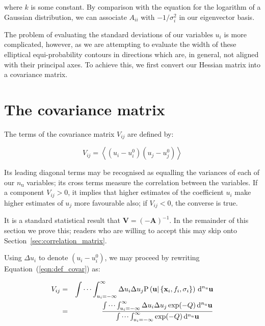 \noindent where $k$ is some constant. By comparison with the equation for the
logarithm of a Gaussian distribution, we can associate $A_{ii}$ with
$-1/\sigma_i^2$ in our eigenvector basis.

The problem of evaluating the standard deviations of our variables $u_i$ is
more complicated, however, as we are attempting to evaluate the width of these
elliptical equi-probability contours in directions which are, in general, not
aligned with their principal axes. To achieve this, we first convert our
Hessian matrix into a covariance matrix.

\section{The covariance matrix}

The terms of the covariance matrix $V_{ij}$ are defined by:

\begin{equation}
V_{ij} = \left< \left(u_i - u^0_i\right) \left(u_j - u^0_j\right) \right>
\label{eqn:def_covar}
\end{equation}

\noindent Its leading diagonal terms may be recognised as equalling the
variances of each of our $n_\mathrm{u}$ variables; its cross terms measure the
correlation between the variables. If a component $V_{ij} > 0$, it implies that
higher estimates of the coefficient $u_i$ make higher estimates of $u_j$ more
favourable also; if $V_{ij} < 0$, the converse is true.

It is a standard statistical result that $\mathbf{V} = (-\mathbf{A})^{-1}$. In
the remainder of this section we prove this; readers who are willing to accept
this may skip onto Section~\ref{sec:correlation_matrix}.

Using $\Delta u_i$ to denote $\left(u_i - u^0_i\right)$, we may proceed by
rewriting Equation~(\ref{eqn:def_covar}) as:

\begin{eqnarray}
V_{ij} & = & \idotsint_{u_i=-\infty}^{\infty}
\Delta u_i \Delta u_j
\mathrm{P}\left(
\mathbf{u} | \left\{ \mathbf{x}_i, f_i, \sigma_i \right\} \right)
\,\mathrm{d}^{n_\mathrm{u}}\mathbf{u} \\
 & = & \frac{
\idotsint_{u_i=-\infty}^{\infty} \Delta u_i \Delta u_j \exp(-Q) \,\mathrm{d}^{n_\mathrm{u}}\mathbf{u}
}{
\idotsint_{u_i=-\infty}^{\infty} \exp(-Q) \,\mathrm{d}^{n_\mathrm{u}}\mathbf{u}
}
\nonumber
\end{eqnarray}

